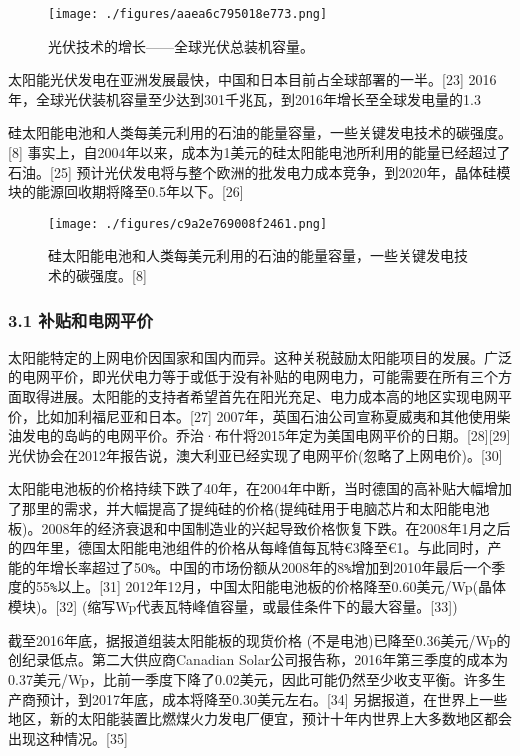 \begin{figure}[ht]
\centering
\texttt{[image: ./figures/aaea6c795018e773.png]}
\caption{光伏技术的增长——全球光伏总装机容量。} \label{fig_TYNDC_14}
\end{figure}

太阳能光伏发电在亚洲发展最快，中国和日本目前占全球部署的一半。[23] 2016年，全球光伏装机容量至少达到301千兆瓦，到2016年增长至全球发电量的1.3%

硅太阳能电池和人类每美元利用的石油的能量容量，一些关键发电技术的碳强度。[8]
事实上，自2004年以来，成本为1美元的硅太阳能电池所利用的能量已经超过了石油。[25] 预计光伏发电将与整个欧洲的批发电力成本竞争，到2020年，晶体硅模块的能源回收期将降至0.5年以下。[26]

\begin{figure}[ht]
\centering
\texttt{[image: ./figures/c9a2e769008f2461.png]}
\caption{硅太阳能电池和人类每美元利用的石油的能量容量，一些关键发电技术的碳强度。[8]} \label{fig_TYNDC_15}
\end{figure}


\subsubsection{3.1 补贴和电网平价}

太阳能特定的上网电价因国家和国内而异。这种关税鼓励太阳能项目的发展。广泛的电网平价，即光伏电力等于或低于没有补贴的电网电力，可能需要在所有三个方面取得进展。太阳能的支持者希望首先在阳光充足、电力成本高的地区实现电网平价，比如加利福尼亚和日本。[27] 2007年，英国石油公司宣称夏威夷和其他使用柴油发电的岛屿的电网平价。乔治·布什将2015年定为美国电网平价的日期。[28][29] 光伏协会在2012年报告说，澳大利亚已经实现了电网平价(忽略了上网电价)。[30]

太阳能电池板的价格持续下跌了40年，在2004年中断，当时德国的高补贴大幅增加了那里的需求，并大幅提高了提纯硅的价格(提纯硅用于电脑芯片和太阳能电池板)。2008年的经济衰退和中国制造业的兴起导致价格恢复下跌。在2008年1月之后的四年里，德国太阳能电池组件的价格从每峰值每瓦特€3降至€1。与此同时，产能的年增长率超过了50\verb|%|。中国的市场份额从2008年的8\verb|%|增加到2010年最后一个季度的55\verb|%|以上。[31] 2012年12月，中国太阳能电池板的价格降至0.60美元/Wp(晶体模块)。[32] (缩写Wp代表瓦特峰值容量，或最佳条件下的最大容量。[33])

截至2016年底，据报道组装太阳能板的现货价格 (不是电池)已降至0.36美元/Wp的创纪录低点。第二大供应商Canadian Solar公司报告称，2016年第三季度的成本为0.37美元/Wp，比前一季度下降了0.02美元，因此可能仍然至少收支平衡。许多生产商预计，到2017年底，成本将降至0.30美元左右。[34] 另据报道，在世界上一些地区，新的太阳能装置比燃煤火力发电厂便宜，预计十年内世界上大多数地区都会出现这种情况。[35]

